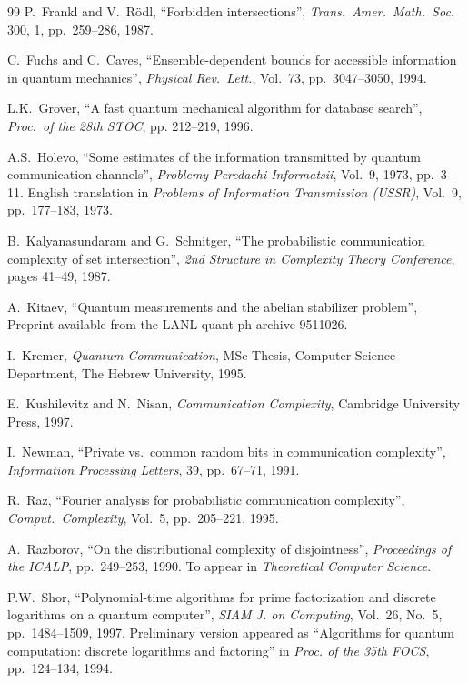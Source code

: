 \begin{thebibliography}{99}
P.~Frankl and V.~R\"odl, ``Forbidden intersections'', 
{\em Trans.\ Amer.\ Math.\ Soc.} 300, 1, pp.~259--286, 1987.

C.~Fuchs and C.~Caves, ``Ensemble-dependent bounds for accessible 
information in quantum mechanics'', {\em Physical Rev.\ Lett.}, 
Vol.~73, pp.~3047--3050, 1994.

L.K.~Grover, ``A fast quantum mechanical algorithm for database search'', 
{\em Proc.\ of the 28th STOC}, pp. 212--219, 1996.

A.S.~Holevo, ``Some estimates of the information transmitted by 
quantum communication channels'', 
{\em Problemy Peredachi Informatsii}, Vol.~9, 1973, pp.~3--11.
English translation in {\em Problems of Information Transmission (USSR)}, 
Vol.~9, pp.~177--183, 1973.

B.~Kalyanasundaram and G.~Schnitger,
``The probabilistic communication complexity of set intersection'',
{\em {\rm 2}nd Structure in Complexity Theory Conference}, 
pages 41--49, 1987.

A.~Kitaev, ``Quantum measurements and the abelian stabilizer problem'', 
Preprint available from the LANL quant-ph archive 9511026.

I.~Kremer, {\em Quantum Communication}, MSc Thesis, 
Computer Science Department, The Hebrew University, 1995.

E.~Kushilevitz and N.~Nisan, {\em Communication Complexity}, 
Cambridge University Press, 1997.

I.~Newman, ``Private vs.\ common random bits in communication complexity'', 
{\em Information Processing Letters}, 39, pp.~67--71, 1991.

R.~Raz, ``Fourier analysis for probabilistic communication complexity'', 
{\em Comput.\ Complexity}, Vol.~5, pp.~205--221, 1995.

A.~Razborov, 
``On the distributional complexity of disjointness'',
{\em Proceedings of the ICALP}, pp.~249--253, 1990.
To appear in {\em Theoretical Computer Science}.

P.W.~Shor,
``Polynomial-time algorithms for prime factorization and discrete logarithms 
on a quantum computer'',
{\em SIAM J. on Computing}, Vol.~26, No.~5, pp.~1484--1509, 1997.
Preliminary version appeared as 
``Algorithms for quantum computation: discrete logarithms and factoring'' 
in {\em Proc. of the 35th FOCS}, pp.~124--134, 1994.


\end{thebibliography}
